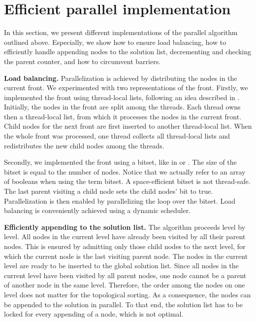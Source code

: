 \documentclass[letterpaper]{article}
\newcommand{\mypar}[1]{{\bf #1.}}
\begin{document}
\begin{invisible}
 
\end{invisible}

\section{Efficient parallel implementation}\label{sec:yourmethod}

In this section, we present different implementations of the parallel algorithm outlined above.
Especially, we show how to ensure load balancing, how to efficiently handle appending nodes to the solution list, decrementing and checking the parent counter, and how to circumvent barriers.

\mypar{Load balancing}
Parallelization is achieved by distributing the nodes in the current front. We experimented with two representations of the front.
Firstly, we implemented the front using thread-local lists, following an idea described in \cite{bulucc2011parallel}. Initially, the nodes in the front are split among the threads.
Each thread owns then a thread-local list, from which it processes the nodes in the current front. Child nodes for the next front are first inserted to another thread-local list.
When the whole front was processed, one thread collects all thread-local lists and redistributes the new child nodes among the threads.

Secondly, we implemented the front using a bitset, like in \cite{agarwal2010scalable} or \cite{beamer2013direction}. The size of the bitset is equal to the number of nodes.
Notice that we actually refer to an array of booleans when using the term bitset. A space-efficient bitset is not thread-safe.
The last parent visiting a child node sets the child nodes' bit to true. Parallelization is then enabled by parallelizing the loop over the bitset.
Load balancing is conveniently achieved using a dynamic scheduler.


\mypar{Efficiently appending to the solution list}
The algorithm proceeds level by level.
All nodes in the current level have already been visited by all their parent nodes. %
This is ensured by admitting only those child nodes to the next level, for which the current node is the last visiting parent node. %
The nodes in the current level are ready to be inserted to the global solution list.
Since all nodes in the current level have been visited by all parent nodes, one node cannot be a parent of another node in the same level.
Therefore, the order among the nodes on one level does not matter for the topological sorting. As a consequence, the nodes can be appended to the solution in parallel.
To that end, the solution list has to be locked for every appending of a node, which is not optimal.
\end{document}
